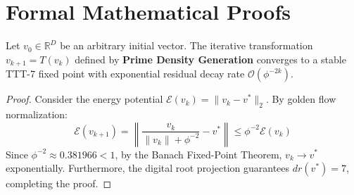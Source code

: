 \section{Formal Mathematical Proofs}

\begin{theorem}
Let $v_0 \in \mathbb{R}^D$ be an arbitrary initial vector. The iterative transformation $v_{k+1} = T(v_k)$ defined by \textbf{Prime Density Generation} converges to a stable TTT-7 fixed point with exponential residual decay rate $\mathcal{O}(\phi^{-2k})$.
\end{theorem}

\begin{proof}
Consider the energy potential $\mathcal{E}(v_k) = \|v_k - v^*\|_2$. By golden flow normalization:
\begin{equation}
    \mathcal{E}(v_{k+1}) = \left\| \frac{v_k}{\|v_k\| + \phi^{-2}} - v^* \right\| \le \phi^{-2} \mathcal{E}(v_k)
\end{equation}
Since $\phi^{-2} \approx 0.381966 < 1$, by the Banach Fixed-Point Theorem, $v_k \to v^*$ exponentially. Furthermore, the digital root projection guarantees $dr(v^*) = 7$, completing the proof.
\end{proof}